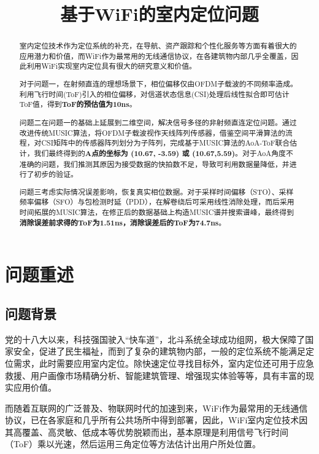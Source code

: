\documentclass[withoutpreface,bwprint]{cumcmthesis}
\title{基于WiFi的室内定位问题}  %
\begin{document}
\maketitle
\begin{abstract}
室内定位技术作为定位系统的补充，在导航、资产跟踪和个性化服务等方面有着很大的应用潜力和价值，而WiFi作为最常用的无线通信协议，在各建筑物内部几乎全覆盖，因此利用WiFi实现室内定位具有很大的研究意义和价值。

对于问题一，在射频直连的理想场景下，相位偏移仅由OFDM子载波的不同频率造成。利用飞行时间(ToF)引入的相位偏移，对信道状态信息(CSI)处理后线性拟合即可估计ToF值，得到\textbf{ToF的预估值为10ns}。

问题二在问题一的基础上延展到二维空间，解决信号多径的非射频直连定位问题。通过改进传统MUSIC算法，将OFDM子载波视作天线阵列传感器，借鉴空间平滑算法的流程，对CSI矩阵中的传感器阵列划分为子阵列，完成基于MUSIC算法的AoA-ToF联合估计，我们最终得到的\textbf{A点的坐标为 (10.67, -3.59) 或 (10.67,5.59)}。对于AoA角度不准确的问题，我们推测其原因为接受数据的快拍数不足，导致可利用数据量降低，并进行了初步的验证。

问题三考虑实际情况误差影响，恢复真实相位数据。对于采样时间偏移（STO）、采样频率偏移（SFO）与包检测时延（PDD），在解卷绕后可采用线性消除处理，而后采用时间拓展的MUSIC算法，在修正后的数据基础上构造MUSIC谱并搜索谱峰，最终得到\textbf{消除误差前求得的ToF为1.51ns，消除误差后的ToF为74.7ns}。

\end{abstract}
\section{问题重述}
\subsection{问题背景}
党的十八大以来，科技强国驶入“快车道”，北斗系统全球成功组网，极大保障了国家安全，促进了民生福祉，而到了复杂的建筑物内部，一般的定位系统不能满足定位需求，此时需要应用室内定位。除快速定位寻找目标外，室内定位还可用于应急救援、用户画像市场精确分析、智能建筑管理、增强现实体验等等，具有丰富的现实应用价值。

而随着互联网的广泛普及、物联网时代的加速到来，WiFi作为最常用的无线通信协议，已在各家庭和几乎所有公共场所中得到部署，因此，WiFi室内定位技术因其高覆盖、高灵敏、低成本等优势脱颖而出，基本原理是利用信号飞行时间（ToF）乘以光速，然后运用三角定位等方法估计出用户所处位置。
\end{document}
